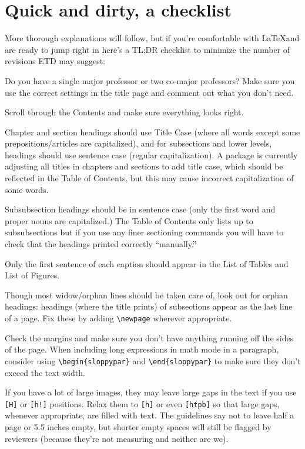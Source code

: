 \chapter{Quick and dirty, a checklist}
More thorough explanations will follow, but if you're comfortable with \LaTeX and are ready to jump right in here's a TL;DR checklist to minimize the number of revisions ETD may suggest:

\begin{todolist}
\item Do you have a single major professor or two co-major professors? Make sure you use the correct settings in the title page and comment out what you don't need.
\item Scroll through the Contents and make sure everything looks right. 
\begin{todolist}
\item Chapter and section headings should use Title Case (where all words except some prepositions/articles are capitalized), and for subsections and lower levels, headings should use sentence case (regular capitalization). A package is currently adjusting all titles in chapters and sections to add title case, which should be reflected in the Table of Contents, but this may cause incorrect capitalization of some words.
\item Subsubsection headings should be in sentence case (only the first word and proper nouns are capitalized.) The Table of Contents only lists up to subsubsections but if you use any finer sectioning commands you will have to check that the headings printed correctly ``manually.''
\item Only the first sentence of each caption should appear in the List of Tables and List of Figures.
\end{todolist}
\item Though most widow/orphan lines should be taken care of, look out for orphan headings: headings (where the title prints) of subsections appear as the last line of a page. Fix these by adding \verb|\newpage| wherever appropriate.
\item Check the margins and make sure you don't have anything running off the sides of the page. When including long expressions in math mode in a paragraph, consider using \verb|\begin{sloppypar}| and \verb|\end{sloppypar}| to make sure they don't exceed the text width. 
\item If you have a lot of large images, they may leave large gaps in the text if you use \texttt{[H]} or \texttt{[h!]} positions. Relax them to \texttt{[h]} or even \texttt{[htpb]} so that large gaps, whenever appropriate, are filled with text. The guidelines say not to leave half a page or 5.5 inches empty, but shorter empty spaces will still be flagged by reviewers (because they're not measuring and neither are we). 

\end{todolist}
